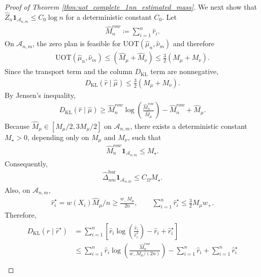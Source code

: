 \documentclass[11pt,reqno]{amsart}
\theoremstyle{definition}
\newcommand{\KL}{\mathrm{KL}}
\renewcommand{\hat}{\widehat}
\begin{document}
\begin{proof}[Proof of Theorem \ref{thm:uot_complete_1nn_estimated_mass}]
We next show that $\hat Z_n\mathbf{1}_{\mathcal{A}_{n,m}}\le C_0\log n$ for a deterministic constant $C_0$.
Let
\begin{align}
    \hat M_n^{row}\coloneqq \sum_{i=1}^n \hat r_i.
\end{align}
On $\mathcal{A}_{n,m}$, the zero plan is feasible for $\mathrm{UOT}(\hat\mu_n,\hat\nu_m)$ and therefore
\begin{align}
    \mathrm{UOT}(\hat\mu_n,\hat\nu_m)
    \le
    (\hat M_\mu+\hat M_\nu)
    \le
    \frac{3}{2}(M_\mu+M_\nu).
\end{align}
Since the transport term and the {column $D_\KL$ term} are nonnegative,
\begin{align}
    {D_\KL}(\hat r\mid \hat\mu)
    \le
    \frac{3}{2}(M_\mu+M_\nu).
\end{align}
By Jensen's inequality,
\begin{align}
    {D_\KL}(\hat r\mid \hat\mu)
    \ge
    \hat M_n^{row}\log\left(\frac{\hat M_n^{row}}{\hat M_\mu}\right)
    - \hat M_n^{row}+\hat M_\mu.
\end{align}
Because $\hat M_\mu\in[M_\mu/2,3M_\mu/2]$ on $\mathcal{A}_{n,m}$, there exists a deterministic constant $M_\star>0$, depending only on $M_\mu$ and $M_\nu$, such that
\begin{align}
    \hat M_n^{row}\mathbf{1}_{\mathcal{A}_{n,m}}
    \le
    M_\star.
\end{align}
Consequently,
\begin{align}
\label{eq:uot_complete_1nn_estimated_mass_bar_uniform}
    \hat\Delta_{nm}^{\mathrm{bar}}\mathbf{1}_{\mathcal{A}_{n,m}}
    \le
    C_\Omega M_\star.
\end{align}
Also, on $\mathcal{A}_{n,m}$,
\begin{align}
    \hat r_i^\star
    =
    w(X_i){\hat M_\mu/n}
    \ge
    \frac{w_-M_\mu}{2n},
    \qquad
    \sum_{i=1}^n \hat r_i^\star
    \le
    \frac{3}{2}M_\mu w_+.
\end{align}
Therefore,
\begin{align}
\label{eq:uot_complete_1nn_estimated_mass_kl_uniform}
\begin{aligned}
    {D_\KL}(\hat r\mid \hat r^\star)
    &=
    \sum_{i=1}^n
    \left[
        \hat r_i\log\left(\frac{\hat r_i}{\hat r_i^\star}\right)-\hat r_i+\hat r_i^\star
    \right] \\
    &\le
    \sum_{i=1}^n \hat r_i \log\left(\frac{\hat M_n^{row}}{w_-M_\mu/(2n)}\right)
    - \sum_{i=1}^n \hat r_i + \sum_{i=1}^n \hat r_i^\star \\

\end{aligned}
\end{align}
\end{proof}
\end{document}
